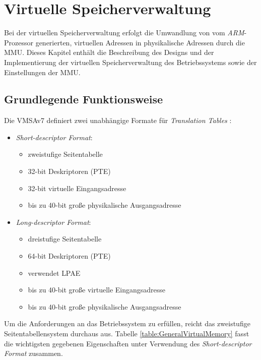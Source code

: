 \section{Virtuelle Speicherverwaltung}
\label{chapVirtualMemory}
Bei der virtuellen Speicherverwaltung erfolgt die Umwandlung von vom \textit{ARM}-Prozessor generierten, virtuellen Adressen in physikalische Adressen durch die \ac{MMU}. Dieses Kapitel enthält die Beschreibung des Designs und der Implementierung der virtuellen Speicherverwaltung des Betriebssystems sowie der Einstellungen der \ac{MMU}.\\

\subsection{Grundlegende Funktionsweise}

Die \ac{VMSAv7} definiert zwei unabhängige Formate für \textit{Translation Tables} \cite[S. B3-1318]{ARM:ARM}:

\begin{itemize}
	\item \emph{Short-descriptor Format}:
	\begin{itemize}
		\item zweistufige Seitentabelle 
		\item 32-bit Deskriptoren (PTE)
		\item 32-bit virtuelle Eingangsadresse 
		\item bis zu 40-bit große physikalische Ausgangsadresse
	\end{itemize}
	\item \emph{Long-descriptor Format}:
	\begin{itemize}
		\item dreistufige Seitentabelle
		\item 64-bit Deskriptoren (\acs{PTE})
		\item verwendet \ac{LPAE}
		\item bis zu 40-bit große virtuelle Eingangsadresse 
		\item bis zu 40-bit große physikalische Ausgangsadresse
	\end{itemize}
\end{itemize}

Um die Anforderungen an das Betriebssystem zu erfüllen, reicht das zweistufige Seitentabellensystem durchaus aus. Tabelle \ref{table:GeneralVirtualMemory} fasst die wichtigsten gegebenen Eigenschaften unter Verwendung des \textit{Short-descriptor Format} zusammen.\\

